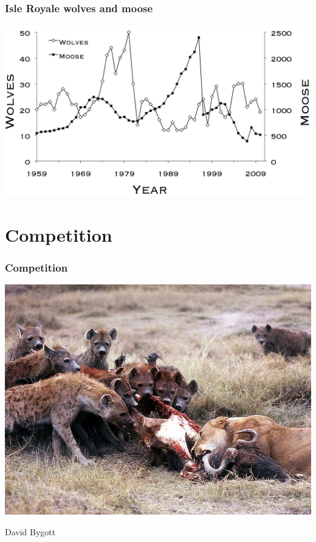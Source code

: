 \documentclass[color=usenames,dvipsnames]{beamer}\usepackage[]{graphicx}\usepackage[]{color}
\begin{document}
\begin{frame}
  \frametitle{Isle Royale wolves and moose}
  \centering
  \includegraphics[width=1\textwidth]{figs/Fig01_wolfmoosechronology} \par
\end{frame}



\section{Competition}



\begin{frame}
  \frametitle{Competition}
  \begin{center}
    \includegraphics[width=.95\textwidth]{figs/Hyena_lion} \par
    \vspace{-0.5cm} \hspace{.75\textwidth}
    {\tiny David Bygott \par}
  \end{center}
\end{frame}
\end{document}

